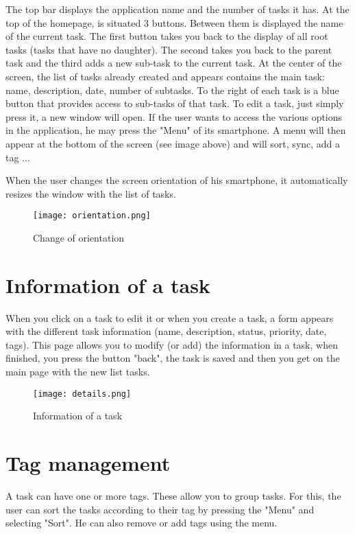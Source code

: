 \noindent The top bar displays the application name and the number of tasks it has.
At the top of the homepage, is situated 3 buttons. Between them is displayed the name of the current task. The first button takes you back to the display of all root tasks (tasks that have no daughter). The second takes you back to the parent task and the third adds a new sub-task to the current task.
At the center of the screen, the list of tasks already created and appears contains the main task: name, description, date, number of subtasks. To the right of each task is a blue button that provides access to sub-tasks of that task. To edit a task, just simply press it, a new window will open.
If the user wants to access the various options in the application, he may press the "Menu" of its smartphone. A menu will then appear at the bottom of the screen (see image above) and will sort, sync, add a tag ...

\noindent When the user changes the screen orientation of his smartphone, it automatically resizes the window with the list of tasks.

\begin{figure}[!ht]
    \centering
    \texttt{[image: orientation.png]}
    \caption{Change of orientation}
\end{figure}

\section{Information of a task}

When you click on a task to edit it or when you create a task, a form appears with the different task information (name, description, status, priority, date, tags). This page allows you to modify (or add) the information in a task, when finished, you press the button "back", the task is saved and then you get on the main page with the new list tasks.

\begin{figure}[!ht]
    \centering
    \texttt{[image: details.png]}
    \caption{Information of a task}
\end{figure}

\section{Tag management}

A task can have one or more tags. These allow you to group tasks. For this, the user can sort the tasks according to their tag by pressing the "Menu" and selecting "Sort". He can also remove or add tags using the menu.

